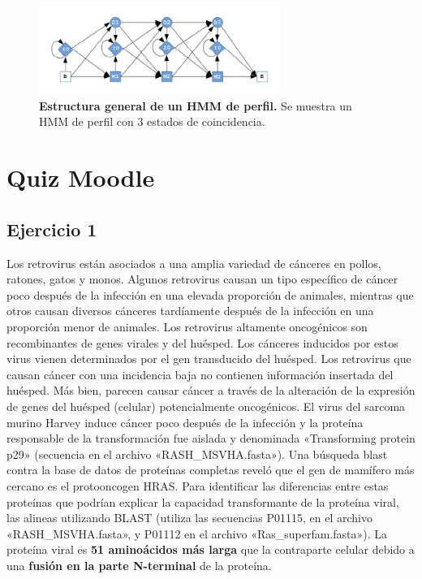 \begin{figure}[htbp]
\centering
\includegraphics[width = 0.7\textwidth]{figs/general-hmm.png}
\caption{\textbf{Estructura general de un HMM de perfil.} Se muestra un HMM de perfil con 3 estados de coincidencia.}
\label{fig:gen-hmm}
\end{figure}

\section{Quiz Moodle}
\subsection{Ejercicio 1}
Los retrovirus están asociados a una amplia variedad de cánceres en pollos, ratones, gatos y monos. Algunos retrovirus causan un tipo específico de cáncer poco después de la infección en una elevada proporción de animales, mientras que otros causan diversos cánceres tardíamente después de la infección en una proporción menor de animales.
Los retrovirus altamente oncogénicos son recombinantes de genes virales y del huésped. Los cánceres inducidos por estos virus vienen determinados por el gen transducido del huésped.
Los retrovirus que causan cáncer con una incidencia baja no contienen información insertada del huésped. Más bien, parecen causar cáncer a través de la alteración de la expresión de genes del huésped (celular) potencialmente oncogénicos.
El virus del sarcoma murino Harvey induce cáncer poco después de la infección y la proteína responsable de la transformación fue aislada y denominada «Transforming protein p29» (secuencia en el archivo «RASH\_MSVHA.fasta»). Una búsqueda blast contra la base de datos de proteínas completas reveló que el gen de mamífero más cercano es el protooncogen HRAS. Para identificar las diferencias entre estas proteínas que podrían explicar la capacidad transformante de la proteína viral, las alineas utilizando BLAST (utiliza las secuencias P01115, en el archivo «RASH\_MSVHA.fasta», y P01112 en el archivo «Ras\_superfam.fasta»). La proteína viral es \textbf{51 aminoácidos más larga} que la contraparte celular debido a una \textbf{fusión en la parte N-terminal} de la proteína. 

